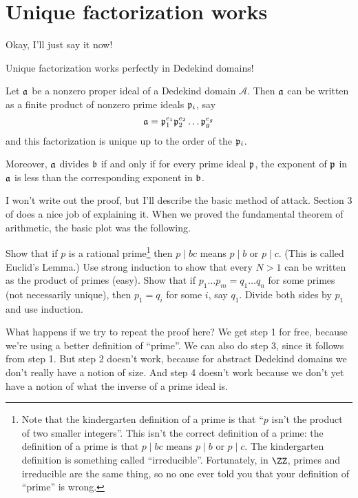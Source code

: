 \section{Unique factorization works}
Okay, I'll just say it now!
\begin{moral}
Unique factorization works perfectly in Dedekind domains!
\end{moral}
\begin{theorem}
	Let $\aa$ be a nonzero proper ideal of a Dedekind domain $\mathcal A$.
	Then $\aa$ can be written as a finite product of nonzero prime ideals $\pp_i$, say
	\[ \aa = \pp_1^{e_1} \pp_2^{e_2} \dots \pp_g^{e_g} \]
	and this factorization is unique up to the order of the $\pp_i$.

	Moreover, $\aa$ divides $\bb$ if and only if for every prime ideal $\pp$,
	the exponent of $\pp$ in $\aa$ is less than the corresponding exponent in $\bb$.
\end{theorem}

I won't write out the proof, but I'll describe the basic method of attack.
Section 3 of \cite{ref:ullery} does a nice job of explaining it.
When we proved the fundamental theorem of arithmetic, the basic plot was the following.
\begin{enumerate}[(1)]
	\ii Show that if $p$ is a rational prime\footnote{
		Note that the kindergarten definition of a prime is that ``$p$ isn't the product of two smaller integers''.
		This isn't the correct definition of a prime: the definition of a prime is that $p \mid bc$
		means $p \mid b$ or $p \mid c$.
		The kindergarten definition is something called ``irreducible''.
		Fortunately, in $\ZZ$, primes and irreducible are the same thing,
		so no one ever told you that your definition of ``prime'' is wrong.}
	then $p \mid bc$ means $p \mid b$ or $p \mid c$.  (This is called Euclid's Lemma.)
	\ii Use strong induction to show that every $N > 1$ can be written as the product of primes (easy).
	\ii Show that if $p_1 \dots p_m = q_1 \dots q_n$ for some primes (not necessarily unique),
	then $p_1 = q_i$ for some $i$, say $q_1$.
	\ii Divide both sides by $p_1$ and use induction.
\end{enumerate}
What happens if we try to repeat the proof here?
We get step 1 for free, because we're using a better definition of ``prime''.
We can also do step 3, since it follows from step 1.
But step 2 doesn't work, because for abstract Dedekind domains we don't really have a notion of size.
And step 4 doesn't work because we don't yet have a notion of what the inverse of a prime ideal is.

